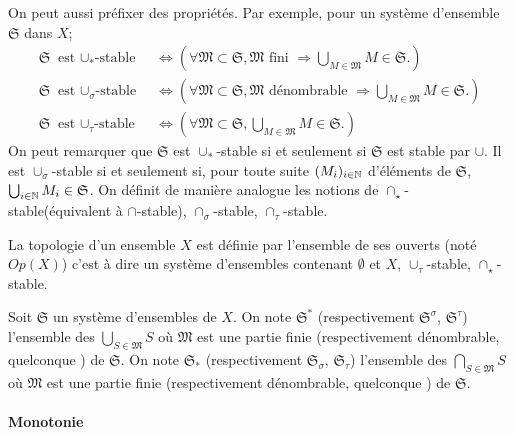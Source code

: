 On peut aussi préfixer des propriétés. Par exemple, pour un système d'ensemble $\mathfrak{S}$ dans $X$;
\begin{align*}
\mathfrak{S} \text{ est $\cup_*$-stable } &\Leftrightarrow \left( \forall \mathfrak{M} \subset \mathfrak{S}, \mathfrak{M} \text{ fini } \Rightarrow \bigcup_{M \in \mathfrak{M}}M \in \mathfrak{S}.\right) \\
\mathfrak{S} \text{ est $\cup_\sigma$-stable } &\Leftrightarrow \left( \forall \mathfrak{M} \subset \mathfrak{S}, \mathfrak{M} \text{ dénombrable } \Rightarrow \bigcup_{M \in \mathfrak{M}}M \in \mathfrak{S}.\right) \\
\mathfrak{S} \text{ est $\cup_\tau$-stable } &\Leftrightarrow \left( \forall \mathfrak{M} \subset \mathfrak{S}, \bigcup_{M \in \mathfrak{M}}M \in \mathfrak{S}.\right)
\end{align*}
On peut remarquer que $\mathfrak{S}$ est $\cup_*$-stable si et seulement si $\mathfrak{S}$ est stable par $\cup$. Il est $\cup_\sigma$-stable si et seulement si, pour toute suite $(M_i)_{i\in \mathbb{N}}$ d'éléments de $\mathfrak{S}$, $\bigcup_{i\in \mathbb{N}}M_i \in \mathfrak{S}$.\newline
On définit de manière analogue les notions de $\cap_\star$-stable(équivalent à $\cap$-stable), $\cap_\sigma$-stable, $\cap_\tau$-stable.
\begin{rem}\label{rem:topologie}
 La topologie d'un ensemble $X$ est définie par l'ensemble de ses ouverts (noté $Op(X)$) c'est à dire un système d'ensembles contenant $\emptyset$ et $X$, $\cup_\tau$-stable, $\cap_\star$-stable.
\end{rem}
\begin{nota}
   Soit $\mathfrak{S}$ un système d'ensembles de $X$.\newline
   On note $\mathfrak{S}^{*}$ (respectivement $\mathfrak{S}^{\sigma}$, $\mathfrak{S}^{\tau}$) l'ensemble des $\bigcup_{S \in \mathfrak{M}}S$ où $\mathfrak{M}$ est une partie finie (respectivement dénombrable, quelconque ) de $\mathfrak{S}$.\newline
   On note $\mathfrak{S}_{*}$ (respectivement $\mathfrak{S}_{\sigma}$, $\mathfrak{S}_{\tau}$) l'ensemble des $\bigcap_{S \in \mathfrak{M}}S$ où $\mathfrak{M}$ est une partie finie (respectivement dénombrable, quelconque ) de $\mathfrak{S}$.
\end{nota}

\paragraph{Monotonie}


